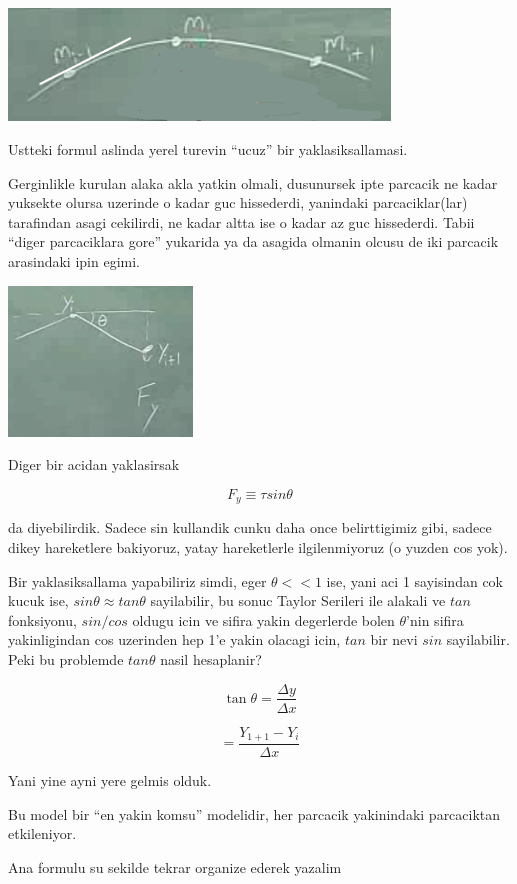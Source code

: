 \documentclass[12pt,fleqn]{article}\usepackage{../common}
\begin{document}
\includegraphics[height=3cm]{1_08.png}

Ustteki formul aslinda yerel turevin ``ucuz'' bir yaklasiksallamasi. 

Gerginlikle kurulan alaka akla yatkin olmali, dusunursek ipte parcacik ne
kadar yuksekte olursa uzerinde o kadar guc hissederdi, yanindaki
parcaciklar(lar) tarafindan asagi cekilirdi, ne kadar altta ise o kadar az
guc hissederdi. Tabii ``diger parcaciklara gore'' yukarida ya da asagida
olmanin olcusu de iki parcacik arasindaki ipin egimi. 

\includegraphics[height=4cm]{1_09.png}

Diger bir acidan yaklasirsak

\[ F_y \equiv \tau sin\theta \]

da diyebilirdik. Sadece sin kullandik cunku daha once belirttigimiz gibi,
sadece dikey hareketlere bakiyoruz, yatay hareketlerle ilgilenmiyoruz (o
yuzden cos yok).

Bir yaklasiksallama yapabiliriz simdi, eger $\theta << 1$ ise, yani aci 1
sayisindan cok kucuk ise, $sin\theta \approx tan\theta$ sayilabilir, bu
sonuc Taylor Serileri ile alakali ve $tan$ fonksiyonu, $sin / cos$ oldugu
icin ve sifira yakin degerlerde bolen $\theta$'nin sifira yakinligindan cos
uzerinden hep 1'e yakin olacagi icin, $tan$ bir nevi $sin$
sayilabilir. Peki bu problemde $tan\theta$ nasil hesaplanir?

\[  \tan\theta = \frac{\Delta y}{\Delta x} \]

\[ = \frac{Y_{1+1}-Y_i}{\Delta x} \]

Yani yine ayni yere gelmis olduk. 

Bu model bir ``en yakin komsu'' modelidir, her parcacik yakinindaki
parcaciktan etkileniyor. 

Ana formulu su sekilde tekrar organize ederek yazalim
\end{document}
